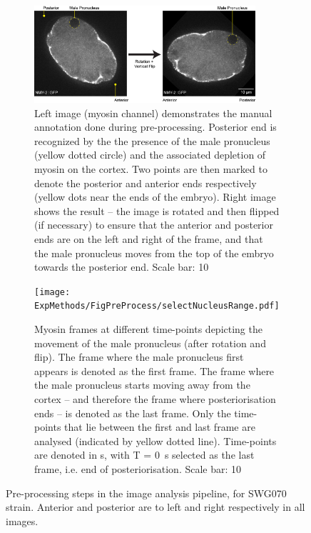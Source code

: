 \begin{figure}[h]
\centering
\begin{subfigure}{\textwidth}
    \centering
    \includegraphics[width=0.9\textwidth]{ExpMethods/FigPreProcess/manualAnnotationRotation.png}   \caption{Left image (myosin channel) demonstrates the manual annotation done during pre-processing. Posterior end is recognized by the the presence of the male pronucleus (yellow dotted circle) and the associated depletion of myosin on the cortex. Two points are then marked to denote the posterior and anterior ends respectively (yellow dots near the ends of the embryo). Right image shows the result -- the image is rotated and then flipped (if necessary) to ensure that the anterior and posterior ends are on the left and right of the frame, and that the male pronucleus moves from the top of the embryo towards the posterior end. Scale bar: \SI{10}{\unitLength}} 
    \label{subfig:preprocess-manual}
\end{subfigure}
\hfill
\begin{subfigure}{\textwidth}
    \centering
    \texttt{[image: ExpMethods/FigPreProcess/selectNucleusRange.pdf]}
    \caption{Myosin frames at different time-points depicting the movement of the male pronucleus (after rotation and flip). The frame where the male pronucleus first appears is denoted as the first frame. The frame where the male pronucleus starts moving away from the cortex -- and therefore the frame where posteriorisation ends -- is denoted as the last frame. Only the time-points that lie between the first and last frame are analysed (indicated by yellow dotted line). Time-points are denoted in \unit{\second}, with T = \SI{0}{\second} selected as the last frame, i.e. end of posteriorisation. Scale bar: \SI{10}{\unitLength}} 
    \label{subfig:preprocess-selectNucleusRange}
\end{subfigure}
\caption[Image analysis: pre-processing]{Pre-processing steps in the image analysis pipeline, for SWG070 strain. Anterior and posterior are to left and right respectively in all images.}
\label{fig:preprocess}
\end{figure}

